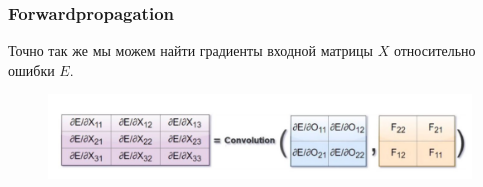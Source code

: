 \documentclass[unicode,9pt, pdf]{beamer}
\begin{document}
\begin{frame}
	\frametitle{Forwardpropagation}
	Точно так же мы можем найти градиенты входной матрицы $X$ относительно ошибки $E$.
\begin{figure}[h]
			\begin{center}
				\begin{minipage}[h]{0.92\linewidth}
					\includegraphics[width=1\linewidth]{cnn6.JPG}
				\end{minipage}
			\end{center}
		\end{figure}

\end{frame}
	
\end{document}
